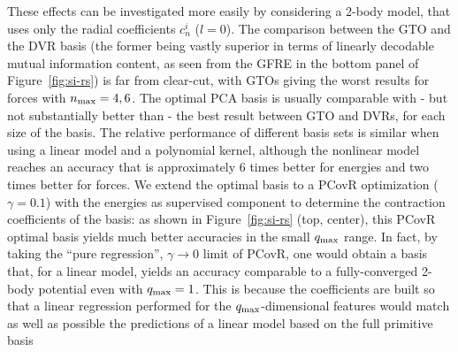 
These effects can be investigated more easily by considering a 2-body model, that uses only the radial coefficients $c^i_n$ ($l=0$).
The comparison between the GTO and the DVR basis (the former being vastly superior in terms of linearly decodable mutual information content, as seen from the GFRE in the bottom panel of Figure~\ref{fig:si-rs}) is far from clear-cut, with GTOs giving the worst results for forces with $n_\mathrm{max}=4,6$. 
The optimal PCA basis is usually comparable with - but not substantially better than - the best result between GTO and DVRs, for each size of the basis. 
The relative performance of different basis sets is similar when using a linear model and a polynomial kernel, although the nonlinear model reaches an accuracy that is approximately 6 times better for energies and two times better for forces.  
We extend the optimal basis to a PCovR optimization ($\gamma = 0.1$) with the energies as supervised component to determine the contraction coefficients of the basis: as shown in Figure~\ref{fig:si-rs} (top, center), this PCovR optimal basis yields much better accuracies in the small $q_\mathrm{max}$ range. 
In fact, by taking the ``pure regression'', $\gamma\rightarrow 0$ limit of PCovR, one would obtain a basis that, for a linear model, yields an accuracy comparable to a fully-converged 2-body potential even with $q_\mathrm{max}=1$. 
This is because the coefficients are built so that a linear regression performed for the $q_\mathrm{max}$-dimensional features would match as well as possible the predictions of a linear model based on the full primitive basis
